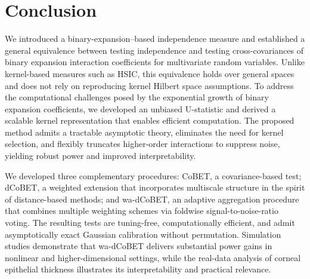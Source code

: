 \documentclass[12pt,reqno,oneside]{amsbook}
\theoremstyle{definition}
\theoremstyle{remark}
\begin{document}
\section{Conclusion}
\label{sec:conclusion}

We introduced a binary-expansion–based independence measure and established a general equivalence between testing independence and testing cross-covariances of binary expansion interaction coefficients for multivariate random variables. Unlike kernel-based measures such as HSIC, this equivalence holds over general spaces and does not rely on reproducing kernel Hilbert space assumptions. To address the computational challenges posed by the exponential growth of binary expansion coefficients, we developed an unbiased U-statistic and derived a scalable kernel representation that enables efficient computation. The proposed method admits a tractable asymptotic theory, eliminates the need for kernel selection, and flexibly truncates higher-order interactions to suppress noise, yielding robust power and improved interpretability.

We developed three complementary procedures: CoBET, a covariance-based test;
dCoBET, a weighted extension that incorporates multiscale structure in the
spirit of distance-based methods; and wa-dCoBET, an adaptive aggregation
procedure that combines multiple weighting schemes via foldwise
signal-to-noise-ratio voting. The resulting tests are tuning-free,
computationally efficient, and admit asymptotically exact Gaussian calibration
without permutation. Simulation studies demonstrate that wa-dCoBET delivers
substantial power gains in nonlinear and higher-dimensional settings, while the
real-data analysis of corneal epithelial thickness illustrates its
interpretability and practical relevance.


\end{document}

